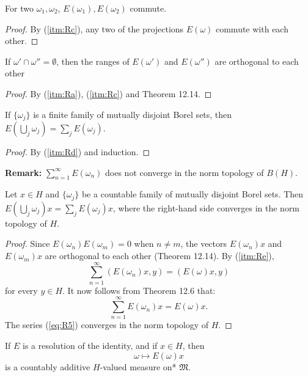 \begin{lemma}
 For two $\omega_1, \omega_2$, \( E(\omega_1), E(\omega_2) \) commute.
\end{lemma}
\begin{proof}
 By (\ref{itm:Rc}), any two of the projections \( E(\omega) \) commute with each other.
\end{proof}

\begin{lemma}
 If \( \omega' \cap \omega'' = \emptyset \),
 then the ranges of \( E(\omega') \) and \( E(\omega'') \) are orthogonal to each other
\end{lemma}
\begin{proof}
 By (\ref{itm:Ra}), (\ref{itm:Rc}) and Theorem 12.14.
\end{proof}

\begin{lemma}
 If $\{\omega_j\}$ is a finite family of mutually disjoint Borel sets, then
 $E(\bigcup_j \omega_j) = \sum_j E(\omega_j)$.
\end{lemma}
\begin{proof}
 By (\ref{itm:Rd}) and induction.
\end{proof}

\textbf{Remark:}
$\sum_{n=1}^{\infty} E(\omega_n)$ does not converge in the norm topology of $B(H)$.

\begin{lemma}
 Let $x \in H$ and $\{\omega_j\}$ be a countable family of mutually disjoint Borel sets.
 Then $E(\bigcup_j \omega_j)x = \sum_j E(\omega_j)x$, where
 the right-hand side converges in the norm topology of $H$.
\end{lemma}
\begin{proof}
 Since \( E(\omega_n)E(\omega_m) = 0 \) when \( n \neq m \), the vectors \( E(\omega_n)x \) and \( E(\omega_m)x \)
 are orthogonal to each other (Theorem 12.14).
 By (\ref{itm:Re}),
 \begin{equation}
   \label{eq:R5}
   \sum_{n=1}^{\infty} (E(\omega_n)x, y) = (E(\omega)x, y)
 \end{equation}
 for every \( y \in H \).
 It now follows from Theorem 12.6 that:
 \[
  \sum_{n=1}^{\infty} E(\omega_n)x = E(\omega)x.
 \]
 The series (\eqref{eq:R5}) converges in the norm topology of \( H \).
\end{proof}

\begin{proposition}[12.18]
  If \( E \) is a resolution of the identity, and if \( x \in H \), then
  \[
    \omega \mapsto E(\omega)x
  \]
  is a countably additive \( H \)-valued measure on* \( \mathfrak{M} \).
\end{proposition}

